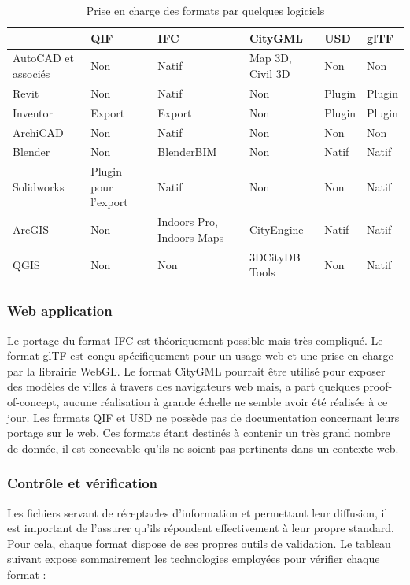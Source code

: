 \documentclass[a4paper,12pt]{article}
\begin{document}
\begin{table}[htbp]
\caption{Prise en charge des formats par quelques logiciels}
\centering
\begin{tabular}{llllll}
 & QIF & IFC & CityGML & USD & glTF\\
\hline
AutoCAD et associés & Non & Natif & Map 3D, Civil 3D & Non & Non\\
Revit & Non & Natif & Non & Plugin & Plugin\\
Inventor & Export & Export & Non & Plugin & Plugin\\
ArchiCAD & Non & Natif & Non & Non & Non\\
Blender & Non & BlenderBIM & Non & Natif & Natif\\
Solidworks & Plugin pour l'export & Natif & Non & Non & Natif\\
ArcGIS & Non & Indoors Pro, Indoors Maps & CityEngine & Natif & Natif\\
QGIS & Non & Non & 3DCityDB Tools & Non & Natif\\
\end{tabular}
\end{table}
\subsubsection*{Web application}
\label{sec:org01f5739}

Le portage du format IFC est théoriquement possible mais très compliqué. \autocite[,@sciencedirectEXPRESSConstruction]{buildingsmartIfcOWLBuildingSMART}
Le format glTF est conçu spécifiquement pour un usage web et une prise en charge par la librairie WebGL. \autocite{githubGlTFTutorialsgltfTutorialgltfTutorial_001_IntroductionmdMain}
Le format CityGML pourrait être utilisé pour exposer des modèles de villes à travers des navigateurs web \autocite[,@prandi3DWebVisualization2015]{el-mekawyIntegratingBIMGIS2010} mais, a part quelques proof-of-concept, aucune réalisation à grande échelle ne semble avoir été réalisée à ce jour.
Les formats QIF et USD ne possède pas de documentation concernant leurs portage sur le web. Ces formats étant destinés à contenir un très grand nombre de donnée, il est concevable qu'ils ne soient pas pertinents dans un contexte web. 
\subsubsection*{Contrôle et vérification}
\label{sec:org785af0f}

Les fichiers servant de réceptacles d'information et permettant leur diffusion, il est important de l'assurer qu'ils répondent effectivement à leur propre standard. Pour cela, chaque format dispose de ses propres outils de validation. 
Le tableau suivant expose sommairement les technologies employées pour vérifier chaque format :
\end{document}
